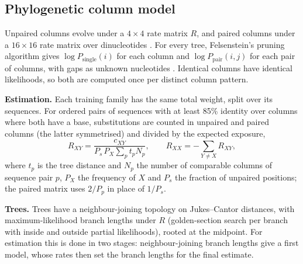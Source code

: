 \documentclass[10pt, twocolumn]{article}
\begin{document}
\subsection{Phylogenetic column model}
Unpaired columns evolve under a $4\times 4$ rate matrix $R$, and paired columns under a $16\times 16$ rate matrix over dinucleotides \cite{knudsen1999}. For every tree, Felsenstein's pruning algorithm \cite{felsenstein1981} gives $\log P_{\text{single}}(i)$ for each column and $\log P_{\text{pair}}(i,j)$ for each pair of columns, with gaps as unknown nucleotides \cite{knudsen2003}. Identical columns have identical likelihoods, so both are computed once per distinct column pattern.

\textbf{Estimation.} Each training family has the same total weight, split over its sequences. For ordered pairs of sequences with at least 85\% identity over columns where both have a base, substitutions are counted in unpaired and paired columns (the latter symmetrised) and divided by the expected exposure,
$$R_{XY} = \frac{c_{XY}}{P_s\,P_X \sum_p t_p N_p},\qquad R_{XX} = -\sum_{Y\neq X} R_{XY},$$
where $t_p$ is the tree distance and $N_p$ the number of comparable columns of sequence pair $p$, $P_X$ the frequency of $X$ and $P_s$ the fraction of unpaired positions; the paired matrix uses $2/P_p$ in place of $1/P_s$.

\textbf{Trees.} Trees have a neighbour-joining topology \cite{saitou1987} on Jukes--Cantor distances, with maximum-likelihood branch lengths under $R$ (golden-section search per branch with inside and outside partial likelihoods), rooted at the midpoint. For estimation this is done in two stages: neighbour-joining branch lengths give a first model, whose rates then set the branch lengths for the final estimate.
\end{document}
